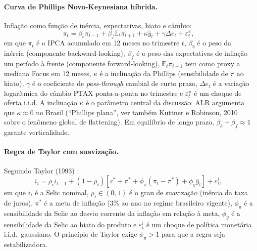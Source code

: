 \documentclass[11pt,a4paper]{article}
\begin{document}
\paragraph{Curva de Phillips Novo-Keynesiana híbrida.} Inflação como função
de inércia, expectativas, hiato e câmbio:
\begin{equation}\label{eq:phillips}
\pi_t = \beta_b \pi_{t-1} + \beta_f \mathbb{E}_t \pi_{t+1} + \kappa \hat{y}_t + \gamma \Delta e_t + \varepsilon^\pi_t,
\end{equation}
em que $\pi_t$ é o IPCA acumulado em 12 meses no trimestre $t$, $\beta_b$
é o peso da inércia (componente backward-looking), $\beta_f$ é o peso das
expectativas de inflação um período à frente (componente forward-looking),
$\mathbb{E}_t\pi_{t+1}$ tem como proxy a mediana Focus em 12 meses,
$\kappa$ é a inclinação da Phillips (sensibilidade de $\pi$ ao hiato),
$\gamma$ é o coeficiente de \emph{pass-through} cambial de curto prazo,
$\Delta e_t$ é a variação logarítmica do câmbio PTAX ponta-a-ponta no
trimestre e $\varepsilon^\pi_t$ é um choque de oferta i.i.d. A
inclinação $\kappa$ é o parâmetro central da discussão: ALR argumenta
que $\kappa \approx 0$ no Brasil (``Phillips plana'', ver também
Kuttner e Robinson, 2010 \cite{kuttner2010} sobre o fenômeno global de
flattening). Em equilíbrio de longo prazo, $\beta_b + \beta_f \approx 1$
garante verticalidade.

\paragraph{Regra de Taylor com suavização.} Seguindo Taylor (1993)
\cite{taylor1993}:
\begin{equation}\label{eq:taylor}
i_t = \rho_i i_{t-1} + (1 - \rho_i) \left[ r^* + \pi^* + \phi_\pi (\pi_t - \pi^*) + \phi_y \hat{y}_t \right] + \varepsilon^i_t,
\end{equation}
em que $i_t$ é a Selic nominal, $\rho_i \in (0,1)$ é o grau de
suavização (inércia da taxa de juros), $\pi^*$ é a meta de inflação
(3\% ao ano no regime brasileiro vigente), $\phi_\pi$ é a sensibilidade
da Selic ao desvio corrente da inflação em relação à meta, $\phi_y$ é a
sensibilidade da Selic ao hiato do produto e $\varepsilon^i_t$ é um
choque de política monetária i.i.d.\ gaussiano. O princípio de Taylor
exige $\phi_\pi > 1$ para que a regra seja estabilizadora.
\end{document}
